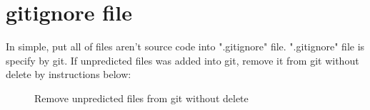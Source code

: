 \section{gitignore file}

\begin{crules}
\end{crules}

In simple, put all of files aren't source code into ".gitignore" file.
".gitignore" file is specify by git. If unpredicted files was added into git,
remove it from git without delete by instructions below:

\begin{figure}[h]
    \caption{Remove unpredicted files from git without delete}
    
\end{figure}
